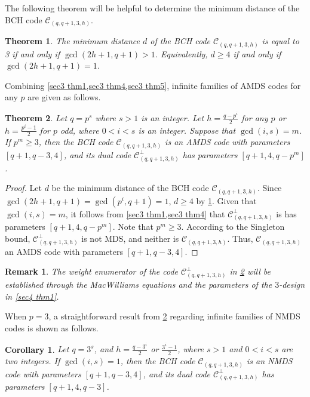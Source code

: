 \documentclass[sn-mathphys-num]{sn-jnl}%
\theoremstyle{thmstyleone}%
\newtheorem{theorem}{Theorem}%
\newtheorem{corollary}{Corollary}
\theoremstyle{thmstyletwo}%
\newtheorem{remark}{Remark}%
\theoremstyle{thmstylethree}%
\begin{document}
The following theorem will be helpful to determine the minimum distance of the BCH code $\mathcal{C}_{(q,q+1,3,h)}$.
\begin{theorem}\cite[Theorem 2]{Xu2023InfiniteFamiliesMDS}
	\label{sec3 thm5}
	The minimum distance $d$ of the BCH code $\mathcal{C}_{(q,q+1,3,h)}$ is equal to 3 if and only if $\gcd(2h+1,q+1)>1$. Equivalently, $d \ge 4$ if and only if $\gcd(2h+1,q+1)=1$.
\end{theorem}

Combining \cref{sec3 thm1,sec3 thm4,sec3 thm5}, infinite families of AMDS codes for any $p$ are given as follows. 
\begin{theorem}
	\label{sec3 thm6}
	Let $q=p^s$ where $s>1$ is an integer. Let $h=\frac{q-p^i}{2}$ for any $p$ or $h=\frac{p^i-1}{2}$ for $p$ odd, where $0<i<s$ is an integer. Suppose that $\gcd(i,s)=m$. If $p^m\ge3$, then the BCH code $\mathcal{C}_{(q,q+1,3,h)}$ is an AMDS code with parameters $[q+1,q-3,4]$, and its dual code $\mathcal{C}^\perp_{(q,q+1,3,h)}$ has parameters $[q+1,4,q-p^m]$.
\end{theorem}
\begin{proof}
	Let $d$ be the minimum distance of the BCH code $\mathcal{C}_{(q,q+1,3,h)}$. Since $\gcd(2h+1,q+1)=\gcd(p^i,q+1)=1$, $d\ge4$ by \cref{sec3 thm5}. Given that $\gcd(i,s)=m$, it follows from \cref{sec3 thm1,sec3 thm4} that $\mathcal{C}^\perp_{(q,q+1,3,h)}$ is has parameters $[q+1,4,q-p^m]$. Note that $p^m\ge 3$. According to the Singleton bound, $\mathcal{C}^\perp_{(q,q+1,3,h)}$ is not MDS, and neither is $\mathcal{C}_{(q,q+1,3,h)}$. Thus,  $\mathcal{C}_{(q,q+1,3,h)}$ an AMDS code with parameters $[q+1,q-3,4]$.
\end{proof}

\begin{remark}
	The weight enumerator of the code $\mathcal{C}^\perp_{(q,q+1,3,h)}$ in \cref{sec3 thm6} will be established through the MacWilliams equations and the parameters of the $3$-design in \cref{sec4 thm1}.
\end{remark}

When $p=3$, a straightforward result from \cref{sec3 thm6} regarding infinite families of NMDS codes is shown as follows.
\begin{corollary}
	\label{sec3 cor2}
	Let $q=3^s$, and $h=\frac{q-3^i}{2}$ or $\frac{3^i-1}{2}$, where $s>1$ and $0<i<s$ are two integers. If $\gcd(i,s)=1$, then the BCH code $\mathcal{C}_{(q,q+1,3,h)}$ is an NMDS code with parameters $[q+1,q-3,4]$, and its dual code $\mathcal{C}^\perp_{(q,q+1,3,h)}$ has parameters $[q+1,4,q-3]$.
\end{corollary}
\end{document}
